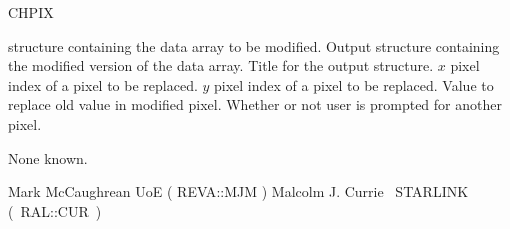 {\begin{manroutinedescription}
  CHPIX

\begin{manparametertable}
  {} structure containing the data array to be modified.
  Output {} structure containing the modified version of
  the data array.
  Title for the output {} structure. \mbox{}
  {$x$} pixel index of a pixel to be replaced.
  {$y$} pixel index of a pixel to be replaced.
  Value to replace old value in modified pixel.
  Whether or not user is prompted for another pixel.
\end{manparametertable}
  None known.

  Mark McCaughrean UoE ( {\mantt REVA}::{\mantt MJM} )
  Malcolm J. Currie ~STARLINK \mbox{( {\mantt RAL}::{\mantt CUR} )}
\end{manroutinedescription}

}
